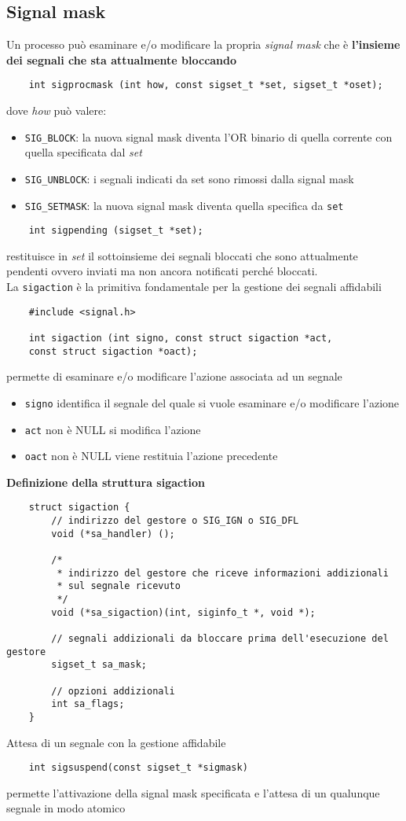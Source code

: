 \documentclass[italian,12pt,a4paper]{article}
\begin{document}
\subsection{Signal mask}
Un processo può esaminare e/o modificare la propria \textit{signal mask} che è \textbf{l'insieme dei segnali che sta attualmente bloccando}
\begin{verbatim}
	int sigprocmask (int how, const sigset_t *set, sigset_t *oset);
\end{verbatim}
dove \textit{how} può valere:
\begin{itemize}
	\item \verb|SIG_BLOCK|: la nuova signal mask diventa l'OR binario di quella corrente con quella specificata dal \textit{set}
	\item \verb|SIG_UNBLOCK|: i segnali indicati da set sono rimossi dalla signal mask
	\item \verb|SIG_SETMASK|: la nuova signal mask diventa quella specifica da \verb|set|
\end{itemize}
\begin{verbatim}
	int sigpending (sigset_t *set);
\end{verbatim}
restituisce in \textit{set} il sottoinsieme dei segnali bloccati che sono attualmente pendenti ovvero inviati ma non ancora notificati perché bloccati.\\
La \verb|sigaction| è la primitiva fondamentale per la gestione dei segnali affidabili
\begin{verbatim}
	#include <signal.h>
	
	int sigaction (int signo, const struct sigaction *act, 
	const struct sigaction *oact);
\end{verbatim}
permette di esaminare e/o modificare l'azione associata ad un segnale
\begin{itemize}
	\item \verb|signo| identifica il segnale del quale si vuole esaminare e/o modificare l'azione
	\item \verb|act| non è NULL si modifica l'azione
	\item \verb|oact| non è NULL viene restituia l'azione precedente
\end{itemize}
\newpage
\textbf{Definizione della struttura sigaction}
\begin{verbatim}
	struct sigaction {
		// indirizzo del gestore o SIG_IGN o SIG_DFL
		void (*sa_handler) ();
		
		/* 
		 * indirizzo del gestore che riceve informazioni addizionali 
		 * sul segnale ricevuto
		 */
		void (*sa_sigaction)(int, siginfo_t *, void *);
		
		// segnali addizionali da bloccare prima dell'esecuzione del gestore
		sigset_t sa_mask;
		
		// opzioni addizionali
		int sa_flags;
	}
\end{verbatim}
Attesa di un segnale con la gestione affidabile
\begin{verbatim}
	int sigsuspend(const sigset_t *sigmask)
\end{verbatim}
permette l'attivazione della signal mask specificata e l'attesa di un qualunque segnale in modo atomico
\newpage
\end{document}
